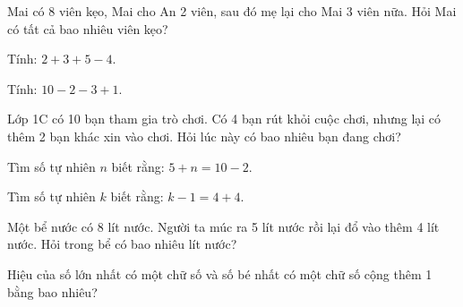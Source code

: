 \begin{ex}
Mai có 8 viên kẹo, Mai cho An 2 viên, sau đó mẹ lại cho Mai 3 viên nữa. Hỏi Mai có tất cả bao nhiêu viên kẹo?
\end{ex}

\begin{ex}
Tính: $2 + 3 + 5 - 4$.
\end{ex}

\begin{ex}
Tính: $10 - 2 - 3 + 1$.
\end{ex}

\begin{ex}
Lớp 1C có 10 bạn tham gia trò chơi. Có 4 bạn rút khỏi cuộc chơi, nhưng lại có thêm 2 bạn khác xin vào chơi. Hỏi lúc này có bao nhiêu bạn đang chơi?
\end{ex}

\begin{ex}
Tìm số tự nhiên $n$ biết rằng: $5 + n = 10 - 2$.
\end{ex}

\begin{ex}
Tìm số tự nhiên $k$ biết rằng: $k - 1 = 4 + 4$.
\end{ex}

\begin{ex}
Một bể nước có 8 lít nước. Người ta múc ra 5 lít nước rồi lại đổ vào thêm 4 lít nước. Hỏi trong bể có bao nhiêu lít nước?
\end{ex}

\begin{ex}
Hiệu của số lớn nhất có một chữ số và số bé nhất có một chữ số cộng thêm 1 bằng bao nhiêu?
\end{ex}
